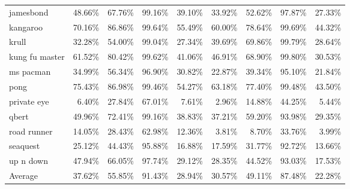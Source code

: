 \begin{table}[h!]
{\begin{tabular}{l|rrrr|rrrr}
        jamesbond & 48.66\% & 67.76\% & 99.16\% & 39.10\% & 33.92\% & 52.62\% & 97.87\% & 27.33\% \\
        kangaroo & 70.16\% & 86.86\% & 99.64\% & 55.49\% & 60.00\% & 78.64\% & 99.69\% & 44.32\% \\
        krull & 32.28\% & 54.00\% & 99.04\% & 27.34\% & 39.69\% & 69.86\% & 99.79\% & 28.64\% \\
        kung fu master & 61.52\% & 80.42\% & 99.62\% & 41.06\% & 46.91\% & 68.90\% & 99.80\% & 30.53\% \\
        ms pacman & 34.99\% & 56.34\% & 96.90\% & 30.82\% & 22.87\% & 39.34\% & 95.10\% & 21.84\% \\
        pong & 75.43\% & 86.98\% & 99.46\% & 54.27\% & 63.18\% & 77.40\% & 99.48\% & 43.50\% \\
        private eye & 6.40\% & 27.84\% & 67.01\% & 7.61\% & 2.96\% & 14.88\% & 44.25\% & 5.44\% \\
        qbert & 49.96\% & 72.41\% & 99.16\% & 38.83\% & 37.21\% & 59.20\% & 93.98\% & 29.35\% \\
        road runner & 14.05\% & 28.43\% & 62.98\% & 12.36\% & 3.81\% & 8.70\% & 33.76\% & 3.99\% \\
        seaquest & 25.12\% & 44.43\% & 95.88\% & 16.88\% & 17.59\% & 31.77\% & 92.72\% & 13.66\% \\
        up n down & 47.94\% & 66.05\% & 97.74\% & 29.12\% & 28.35\% & 44.52\% & 93.03\% & 17.53\% \\
        \midrule
        Average & 37.62\% & 55.85\% & 91.43\% & 28.94\% & 30.57\% & 49.11\% & 87.48\% & 22.28\% \\
        \bottomrule
    \end{tabular}
    }
    \label{tab:option-in-tree-op3-op6}
\end{table}

